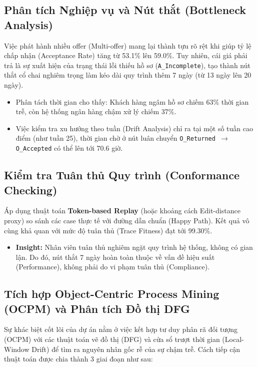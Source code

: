 \documentclass[a4paper,12pt]{article}
\begin{document}
\subsection{Phân tích Nghiệp vụ và Nút thắt (Bottleneck Analysis)}
Việc phát hành nhiều offer (Multi-offer) mang lại thành tựu rõ rệt khi giúp tỷ lệ chấp nhận (Acceptance Rate) tăng từ 53.1\% lên 59.0\%. Tuy nhiên, cái giá phải trả là sự xuất hiện của trạng thái lỗi thiếu hồ sơ (\texttt{A\_Incomplete}), tạo thành nút thắt cổ chai nghiêm trọng làm kéo dài quy trình thêm 7 ngày (từ 13 ngày lên 20 ngày).
\begin{itemize}
    \item Phân tách thời gian cho thấy: Khách hàng ngâm hồ sơ chiếm 63\% thời gian trễ, còn hệ thống ngân hàng chậm xử lý chiếm 37\%.
    \item Việc kiểm tra xu hướng theo tuần (Drift Analysis) chỉ ra tại một số tuần cao điểm (như tuần 25), thời gian chờ ở nút luân chuyển \texttt{O\_Returned $\rightarrow$ O\_Accepted} có thể lên tới 70.6 giờ.
\end{itemize}

\subsection{Kiểm tra Tuân thủ Quy trình (Conformance Checking)}
Áp dụng thuật toán \textbf{Token-based Replay} (hoặc khoảng cách Edit-distance proxy) so sánh các case thực tế với đường dẫn chuẩn (Happy Path). Kết quả vô cùng khả quan với mức độ tuân thủ (Trace Fitness) đạt tới 99.30\%.
\begin{itemize}
    \item \textbf{Insight:} Nhân viên tuân thủ nghiêm ngặt quy trình hệ thống, không có gian lận. Do đó, nút thắt 7 ngày hoàn toàn thuộc về vấn đề hiệu suất (Performance), không phải do vi phạm tuân thủ (Compliance).
\end{itemize}

\subsection{Tích hợp Object-Centric Process Mining (OCPM) và Phân tích Đồ thị DFG}

Sự khác biệt cốt lõi của dự án nằm ở việc kết hợp tư duy phân rã đối tượng (OCPM) với các thuật toán vẽ đồ thị (DFG) và cửa sổ trượt thời gian (Local-Window Drift) để tìm ra nguyên nhân gốc rễ của sự chậm trễ. Cách tiếp cận thuật toán được chia thành 3 giai đoạn như sau:
\end{document}
